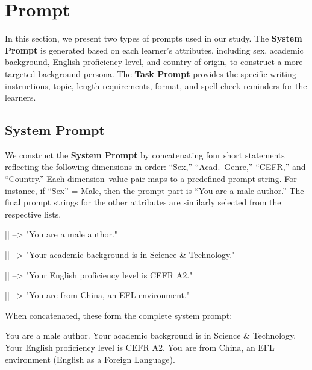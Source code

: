 \section{Prompt}
\label{sec:prompt-content}
In this section, we present two types of prompts used in our study. The \textbf{System Prompt} is generated based on each learner’s attributes, including sex, academic background, English proficiency level, and country of origin, to construct a more targeted background persona. The \textbf{Task Prompt} provides the specific writing instructions, topic, length requirements, format, and spell-check reminders for the learners.


\subsection{System Prompt}
\label{sec:system_prompt}

We construct the \textbf{System Prompt} by concatenating four short statements reflecting the following dimensions in order: ``Sex,'' ``Acad.~Genre,'' ``CEFR,'' and ``Country.'' Each dimension--value pair maps to a predefined prompt string. For instance, if ``Sex'' = Male, then the prompt part is ``You are a male author.'' The final prompt strings for the other attributes are similarly selected from the respective lists. 

\vspace{1em}
\noindent
\begin{showcase}[title=Example]


||
--> "You are a male author."

||
--> "Your academic background is in Science \& Technology."

|| 
--> "Your English proficiency level is CEFR A2."

|| 
--> "You are from China, an EFL environment."


\end{showcase}


When concatenated, these form the complete system prompt:

\begin{prompt}[title={Prompt \thetcbcounter: Male, Sci\_Tech, A2\_0, CHN}]
You are a male author. 
Your academic background is in Science \& Technology. 
Your English proficiency level is CEFR A2. 
You are from China, an EFL environment (English as a Foreign Language). 
\end{prompt}

